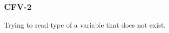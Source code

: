 \subsubsection{CFV-2}\label{sec:error_code_cfv_2}

Trying to read type of a variable that does not exist.


